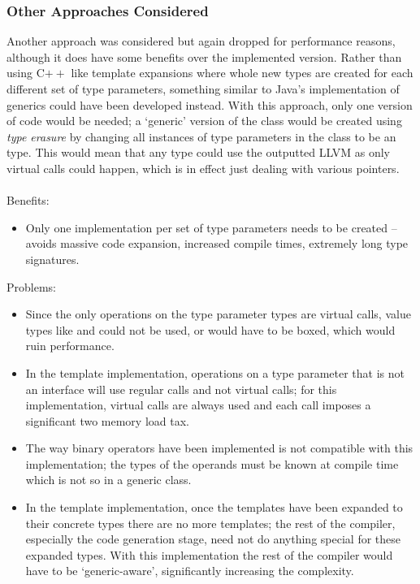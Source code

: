 \documentclass{article}
\newcommand{\bt}{\ensuremath{^{\backprime}}}
\newcommand*{\cpp}{C\ensuremath{++}\xspace}
\newcommand{\code}[1]{\texttt{\StrSubstitute{#1}{`}{\bt}}}
\newcommand{\bcode}[1]{\code{#1}}
\begin{document}
\subsubsection{Other Approaches Considered}
\label{sec:TemplateOtherApproaches}
Another approach was considered but again dropped for performance reasons, although it does have some benefits over the implemented version. Rather than using \cpp like template expansions where whole new types are created for each different set of type parameters, something similar to Java's implementation of generics could have been developed instead. With this approach, only one version of code would be needed; a `generic' version of the class would be created using \textit{type erasure} by changing all instances of type parameters in the class to be an \bcode{\%Interface*} type. This would mean that any type could use the outputted LLVM as only virtual calls could happen, which is in effect just dealing with various pointers.
\\\\
Benefits:
\begin{itemize}
	\item{Only one implementation per set of type parameters needs to be created -- avoids massive code expansion, increased compile times, extremely long type signatures.}
\end{itemize}
Problems:
\begin{itemize}
	\item{Since the only operations on the type parameter types are virtual calls, value types like \bcode{Int*} and \bcode{Bool} could not be used, or would have to be boxed, which would ruin performance.}
	\item{In the template implementation, operations on a type parameter that is not an interface will use regular calls and not virtual calls; for this implementation, virtual calls are always used and each call imposes a significant two memory load tax.}
	\item{The way binary operators have been implemented is not compatible with this implementation; the types of the operands must be known at compile time which is not so in a generic class.}	
	\item{In the template implementation, once the templates have been expanded to their concrete types there are no more templates; the rest of the compiler, especially the code generation stage, need not do anything special for these expanded types. With this implementation the rest of the compiler would have to be `generic-aware', significantly increasing the complexity.}
\end{itemize}
\end{document}
